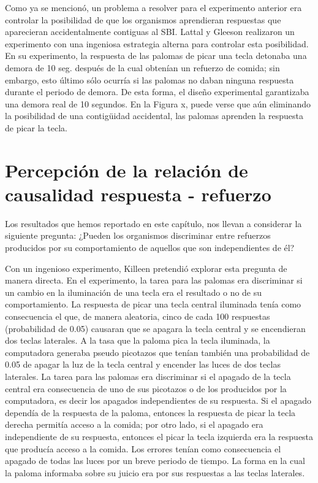 \documentclass[
  letterpaper,
]{book}
\begin{document}
Como ya se mencionó, un problema a resolver para el experimento anterior
era controlar la posibilidad de que los organismos aprendieran
respuestas que aparecieran accidentalmente contiguas al SBI. Lattal y
Gleeson realizaron un experimento con una ingeniosa estrategia alterna
para controlar esta posibilidad. En su experimento, la respuesta de las
palomas de picar una tecla detonaba una demora de 10 seg. después de la
cual obtenían un refuerzo de comida; sin embargo, esto último sólo
ocurría si las palomas no daban ninguna respuesta durante el periodo de
demora. De esta forma, el diseño experimental garantizaba una demora
real de 10 segundos. En la Figura x, puede verse que aún eliminando la
posibilidad de una contigüidad accidental, las palomas aprenden la
respuesta de picar la tecla.

\section{Percepción de la relación de causalidad respuesta -
refuerzo}\label{percepciuxf3n-de-la-relaciuxf3n-de-causalidad-respuesta---refuerzo}

Los resultados que hemos reportado en este capítulo, nos llevan a
considerar la siguiente pregunta: ¿Pueden los organismos discriminar
entre refuerzos producidos por su comportamiento de aquellos que son
independientes de él?

Con un ingenioso experimento, Killeen pretendió explorar esta pregunta
de manera directa. En el experimento, la tarea para las palomas era
discriminar si un cambio en la iluminación de una tecla era el resultado
o no de su comportamiento. La respuesta de picar una tecla central
iluminada tenía como consecuencia el que, de manera aleatoria, cinco de
cada 100 respuestas (probabilidad de 0.05) causaran que se apagara la
tecla central y se encendieran dos teclas laterales. A la tasa que la
paloma pica la tecla iluminada, la computadora generaba pseudo picotazos
que tenían también una probabilidad de 0.05 de apagar la luz de la tecla
central y encender las luces de dos teclas laterales. La tarea para las
palomas era discriminar si el apagado de la tecla central era
consecuencia de uno de sus picotazos o de los producidos por la
computadora, es decir los apagados independientes de su respuesta. Si el
apagado dependía de la respuesta de la paloma, entonces la respuesta de
picar la tecla derecha permitía acceso a la comida; por otro lado, si el
apagado era independiente de su respuesta, entonces el picar la tecla
izquierda era la respuesta que producía acceso a la comida. Los errores
tenían como consecuencia el apagado de todas las luces por un breve
periodo de tiempo. La forma en la cual la paloma informaba sobre su
juicio era por sus respuestas a las teclas laterales.
\end{document}
